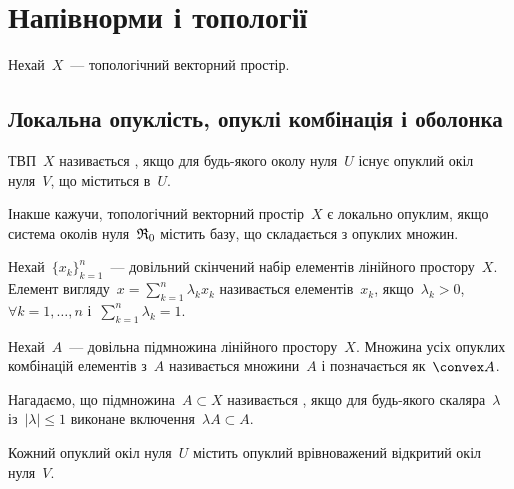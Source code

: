 \chapter{Напівнорми і топології}

Нехай~$X$~--- топологічний векторний простір.

\section{Локальна опуклість, опуклі комбінація і оболонка}

\begin{definition}
    ТВП~$X$ називається , якщо для будь-якого околу нуля~$U$ існує опуклий окіл нуля~$V$, що міститься в~$U$.
\end{definition}

\begin{remark}
    Інакше кажучи, топологічний векторний простір~$X$ є локально опуклим, якщо система околів нуля~$\frak R_0$ містить базу, що складається з опуклих множин.
\end{remark}

\begin{definition}
    Нехай~$\{x_k\}_{k = 1}^n$~--- довільний скінчений набір елементів лінійного простору~$X$. Елемент вигляду~$x = \sum_{k = 1}^n \lambda_k x_k$ називається  елементів~$x_k$, якщо~$\lambda_k > 0$, $\forall k = 1, \dots, n$ і~$\sum_{k = 1}^n \lambda_k = 1$.
\end{definition}

\begin{definition}
    Нехай~$A$~--- довільна підмножина лінійного простору~$X$. Множина усіх опуклих комбінацій елементів з~$A$ називається  множини~$A$ і позначається як~$\convex A$.
\end{definition}

\begin{definition}
    Нагадаємо, що підмножина~$A \subset X$ називається , якщо для будь-якого скаляра~$\lambda$ із~$|\lambda| \le 1$ виконане включення~$\lambda A \subset A$.
\end{definition}

\begin{theorem}
    Кожний опуклий окіл нуля~$U$ містить опуклий врівноважений відкритий окіл нуля~$V$.
\end{theorem}

